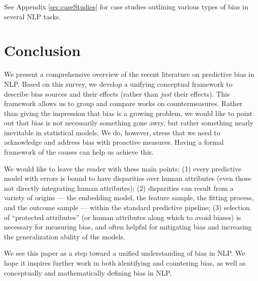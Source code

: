 \documentclass[11pt,a4paper]{article}
\begin{document}
See Appendix \ref{sec:caseStudies} for case studies outlining various types of bias in several NLP tasks.

\section{Conclusion}
We present a comprehensive overview of the recent literature on predictive bias in NLP. 
Based on this survey, we develop a unifying conceptual framework to describe bias sources and their effects (rather than \textit{just} their effects). This framework allows us to group and compare works on countermeasures.
Rather than giving the impression that bias is a growing problem, we would like to point out that bias is not necessarily something gone awry, but rather something nearly inevitable in statistical models. We do, however, stress that we need to acknowledge and address bias with proactive measures. Having a formal framework of the causes can help us achieve this.

We would like to leave the reader with these main points:
(1) every predictive model with errors is bound to have disparities over human attributes (even those not directly integrating human attributes);
(2) disparities can result from a variety of origins --- the embedding model, the feature sample, the fitting process, and the outcome sample --- within the standard predictive pipeline; 
(3) selection of ``protected attributes'' (or human attributes along which to avoid biases) is necessary for measuring bias, and often helpful for mitigating bias and increasing the generalization ability of the models.

We see this paper as a step toward a unified understanding of bias in NLP. We hope it inspires further work in both identifying and countering bias, as well as conceptually and mathematically defining bias in NLP. 
\end{document}
